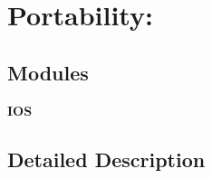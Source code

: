 \section{Portability\-:}
\label{group__port}
\subsection*{Modules}
\begin{DoxyCompactItemize}
\item 
{\bf I\-O\-S}
\end{DoxyCompactItemize}


\subsection{Detailed Description}
